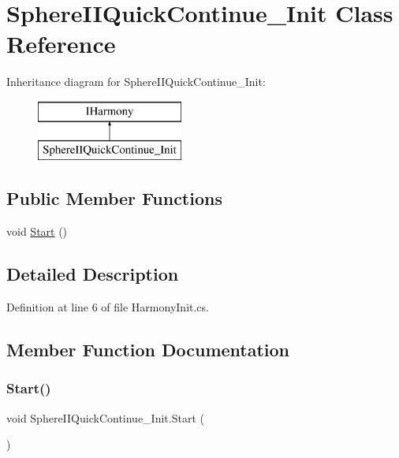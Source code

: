 \hypertarget{class_sphere_i_i_quick_continue___init}{}\section{Sphere\+I\+I\+Quick\+Continue\+\_\+\+Init Class Reference}
\label{class_sphere_i_i_quick_continue___init}
Inheritance diagram for Sphere\+I\+I\+Quick\+Continue\+\_\+\+Init\+:\begin{figure}[H]
\begin{center}
\leavevmode
\includegraphics[height=2.000000cm]{d2/d1b/class_sphere_i_i_quick_continue___init}
\end{center}
\end{figure}
\subsection*{Public Member Functions}
\begin{DoxyCompactItemize}
\item 
void \mbox{\hyperlink{class_sphere_i_i_quick_continue___init_a1d936d4106c65213883483dceb165fbb}{Start}} ()
\end{DoxyCompactItemize}


\subsection{Detailed Description}


Definition at line 6 of file Harmony\+Init.\+cs.



\subsection{Member Function Documentation}
\mbox{\label{class_sphere_i_i_quick_continue___init_a1d936d4106c65213883483dceb165fbb}} 
\subsubsection{\texorpdfstring{Start()}{Start()}}
{\footnotesize\ttfamily void Sphere\+I\+I\+Quick\+Continue\+\_\+\+Init.\+Start (\begin{DoxyParamCaption}{ }\end{DoxyParamCaption})}




